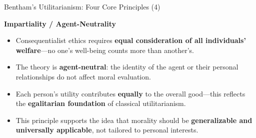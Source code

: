 \documentclass[aspectratio=169, 10pt]{beamer}
\begin{document}
\begin{frame}{Bentham’s Utilitarianism: Four Core Principles (4)}

\textbf{Impartiality / Agent-Neutrality}
\begin{itemize}
    \item Consequentialist ethics requires \textbf{equal consideration of all individuals' welfare}—no one's well-being counts more than another's.
    \item The theory is \textbf{agent-neutral}: the identity of the agent or their personal relationships do not affect moral evaluation.
    \item Each person’s utility contributes \textbf{equally} to the overall good—this reflects the \textbf{egalitarian foundation} of classical utilitarianism.
    \item This principle supports the idea that morality should be \textbf{generalizable and universally applicable}, not tailored to personal interests.
\end{itemize}

\end{frame}
\end{document}
